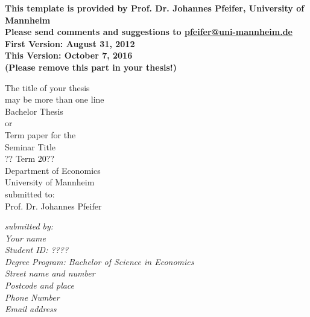 \documentclass[a4paper,12pt]{scrartcl} %
\begin{document}




\begin{titlepage}

\thispagestyle{empty}   %
\begin{center}
\textbf{
This template is provided by Prof. Dr. Johannes Pfeifer, University of Mannheim\\
Please send comments and suggestions to \href{mailto:pfeifer@uni-mannheim.de}{pfeifer@uni-mannheim.de}\\
First Version: August 31, 2012\\
This Version: October 7, 2016\\
(Please remove this part in your thesis!)
}
\end{center}


\begin{center}
\vspace*{2.cm}
{\textbf  \Large The title of your thesis\\may be more than one line} \\
\vspace*{2cm}
Bachelor Thesis\\
or\\
Term paper for the \\ Seminar Title  \\ ?? Term 20??\\
\vspace{0.5cm}
Department of Economics\\
University of Mannheim\\
\vspace*{0.5cm}
submitted to:\\
Prof. Dr. Johannes Pfeifer\\
\vspace*{0.5cm}

\end{center}


\vfill
\begin{flushright}
   \emph{submitted by:} \\
   \emph{Your name} \\
   \emph{Student ID: ????}\\
    \emph{Degree Program: Bachelor of Science in Economics}\\
   \vspace*{0.5cm}
    \emph{Street name and number}\\
    \emph{Postcode and place}\\
   \emph{Phone Number}\\
   \emph{Email address}\\
\end{flushright}


\end{titlepage}
\end{document}
